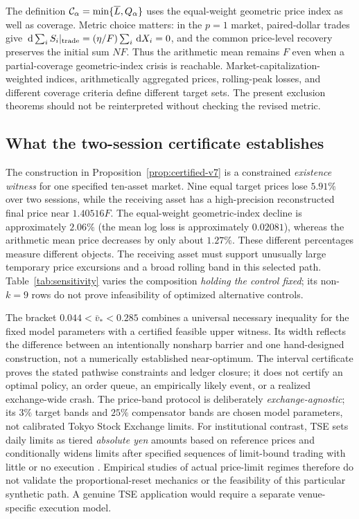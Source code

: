 \documentclass[review,hidelinks,onefignum,onetabnum]{siamonline250211}
\begin{document}
The definition $\mathcal{C}_\alpha=\min\{\overline L,Q_\alpha\}$ uses the equal-weight geometric price index as well as coverage. Metric choice matters: in the $p=1$ market, paired-dollar trades give $\,\mathrm{d}\sum_i S_i|_{\rm trade}=(\eta/F)\sum_i\,\mathrm{d} X_i=0$, and the common price-level recovery preserves the initial sum $NF$. Thus the arithmetic mean remains $F$ even when a partial-coverage geometric-index crisis is reachable. Market-capitalization-weighted indices, arithmetically aggregated prices, rolling-peak losses, and different coverage criteria define different target sets. The present exclusion theorems should not be reinterpreted without checking the revised metric.

\subsection{What the two-session certificate establishes}
The construction in Proposition~\ref{prop:certified-v7} is a constrained \emph{existence witness} for one specified ten-asset market. Nine equal target prices lose $5.91\%$ over two sessions, while the receiving asset has a high-precision reconstructed final price near $1.40516 F$. The equal-weight geometric-index decline is approximately $2.06\%$ (the mean log loss is approximately $0.02081$), whereas the arithmetic mean price decreases by only about $1.27\%$. These different percentages measure different objects. The receiving asset must support unusually large temporary price excursions and a broad rolling band in this selected path. Table~\ref{tab:sensitivity} varies the composition \emph{holding the control fixed}; its non-$k=9$ rows do not prove infeasibility of optimized alternative controls.

The bracket $0.044<\bar v_*<0.285$ combines a universal necessary inequality for the fixed model parameters with a certified feasible upper witness. Its width reflects the difference between an intentionally nonsharp barrier and one hand-designed construction, not a numerically established near-optimum. The interval certificate proves the stated pathwise constraints and ledger closure; it does not certify an optimal policy, an order queue, an empirically likely event, or a realized exchange-wide crash. The price-band protocol is deliberately \emph{exchange-agnostic}; its $3\%$ target bands and $25\%$ compensator bands are chosen model parameters, not calibrated Tokyo Stock Exchange limits. For institutional contrast, TSE sets daily limits as tiered \emph{absolute yen} amounts based on reference prices and conditionally widens limits after specified sequences of limit-bound trading with little or no execution \citep{JPX2026}. Empirical studies of actual price-limit regimes \citep{KimRhee1997,Chen2019} therefore do not validate the proportional-reset mechanics or the feasibility of this particular synthetic path. A genuine TSE application would require a separate venue-specific execution model.
\end{document}

